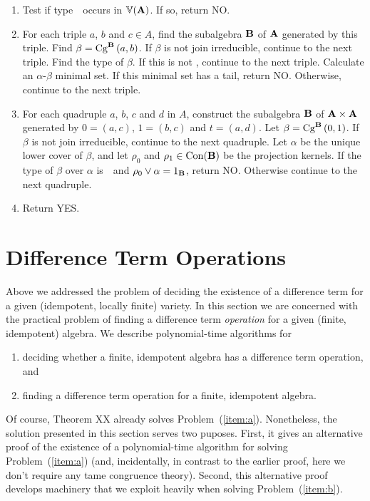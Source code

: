 \begin{enumerate}
\item
Test if type~\utyp\ occurs in $\bbV(\alg A)$. If so, return NO.

\item
For each triple $a$, $b$ and $c\in A$, find the subalgebra 
$\alg B$ of $\alg A$ generated by this triple. Find 
$\beta = \Cga a b{B}$. If $\beta$ is not join irreducible,
continue to the next triple. Find the type of $\beta$. If this
is not \atyp, continue to the next triple. Calculate an
$\alpha$-$\beta$ minimal set. If this minimal set has a 
tail, return NO. Otherwise, continue to the next triple.

\item
For each quadruple  $a$, $b$, $c$ and $d$ in $A$, construct 
the subalgebra $\alg B$ of 
$\alg A \times \alg A$ generated by $0 = (a, c)$, $1 = (b,c)$ 
and $t = (a,d)$.
Let $\beta = \Cga01{B}$.
If $\beta$ is not join irreducible, continue to the next quadruple.
Let $\alpha$ be the unique lower cover of $\beta$, 
and let $\rho_0$ and 
$\rho_1 \in \op{Con}(\alg B)$ be the projection kernels. 
If the type of $\beta$ over $\alpha$
is~\atyp\ and $\rho_0 \join \alpha = 1_{\alg B}$, return NO.
Otherwise continue to the next quadruple.
\item
Return YES.
\end{enumerate}





\section{Difference Term Operations}
Above we addressed the problem of deciding the existence of a difference term 
for a given (idempotent, locally finite) variety.  In this section we are 
concerned with the practical problem of finding a difference term 
\emph{operation} for a given (finite, idempotent) algebra.
We describe polynomial-time algorithms for
\begin{enumerate}
\item \label{item:a} deciding whether a finite, idempotent algebra 
has a difference term operation, and 
\item \label{item:b} finding a difference term operation 
for a finite, idempotent algebra.
\end{enumerate}
Of course, Theorem XX already solves Problem~(\ref{item:a}).
Nonetheless, the solution presented in this section serves
two puposes.  First, it gives an alternative proof of 
the existence of a polynomial-time algorithm for solving Problem~(\ref{item:a})
(and, incidentally, in contrast to the earlier proof, 
here we don't require any tame congruence theory).  
Second, this alternative proof develops machinery
that we exploit heavily when solving Problem~(\ref{item:b}).






